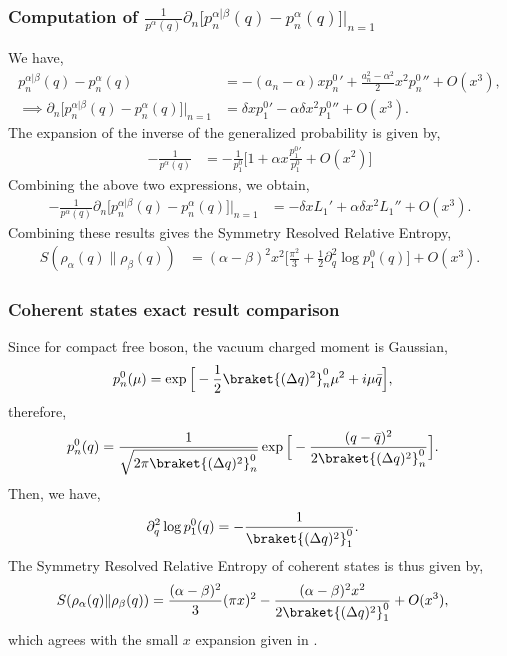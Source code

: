 \documentclass[11pt]{article}
\newcommand{\p}{\partial}
\begin{document}
\subsubsection{\texorpdfstring{Computation of $\frac{1}{p^\alpha(q)}\p_n \big[p_n^{\alpha|\beta}(q ) - p_n^\alpha(q)\big]\big|_{n=1}$}{second term of Sym resolved rel entropy}}
We have,
\begin{align}
    p_n^{\alpha|\beta}(q ) - p_n^\alpha(q) &=- (a_n - \alpha )x p_n^0{'}+ \frac{a_n^2-\alpha^2}{2}x^2p_n^0{''}+ O(x^3),
    \\\implies \p_n \big[p_n^{\alpha|\beta}(q ) - p_n^\alpha(q)\big]\big|_{n=1} &= \delta x p_1^0{'} - \alpha \delta x^2 p_1^0{''} + O(x^3).
\end{align}
The expansion of the inverse of the generalized probability is given by,
\begin{align}
    -\frac{1}{p^\alpha(q)} &= -\frac{1}{p_1^0}\Big[ 1+ \alpha x \frac{p_1^0{'}}{p_1^0} + O(x^2)\Big]
\end{align}
Combining the above two expressions, we obtain,
\begin{align}
   - \frac{1}{p^\alpha(q)}\p_n \big[p_n^{\alpha|\beta}(q ) - p_n^\alpha(q)\big]\big|_{n=1}  &=  - \delta x L_1' + \alpha\delta x^2 L_1'' + O(x^3).
\end{align}
Combining these results gives the Symmetry Resolved Relative Entropy,
\begin{align}
    S(\rho_\alpha(q)\|\rho_\beta(q)) &= (\alpha-\beta)^2x^2 \Big[ \frac{\pi^2}{3} + \frac{1}{2}\p_q^2\log p_1^0(q)  \Big] + O(x^3).
\end{align}
\subsubsection{Coherent states exact result comparison}
Since for compact free boson, the vacuum charged moment is Gaussian, 
\begin{align}
    p_n^0(\mu) &= \exp \Big[ -\frac{1}{2}\braket {(\Delta q)^2}_n^0\mu^2 + i\mu \bar q\Big],
\end{align}
therefore,
\begin{align}
    p_n^0(q) &= \frac{1}{\sqrt{2\pi \braket{(\Delta q)^2}_n^0}}\exp \Big[ -\frac{(q-\bar q)^2}{2\braket{(\Delta q)^2}_n^0}\Big].
\end{align}
Then, we have,
\begin{align}
    \p_q^2 \log p_1^0(q) &= -\frac{1}{\braket{(\Delta q)^2}_1^0}.
\end{align}
The Symmetry Resolved Relative Entropy of coherent states is thus given by,
\begin{align}
    S(\rho_\alpha(q)\|\rho_\beta(q)) &= \frac{(\alpha-\beta)^2}{3}(\pi x)^2  - \frac{(\alpha - \beta)^2x^2}{2\braket{(\Delta q)^2}_1^0}+ O(x^3),
\end{align}
which agrees with the small $x$ expansion given in \cite{Chen_2021}.
\end{document}
